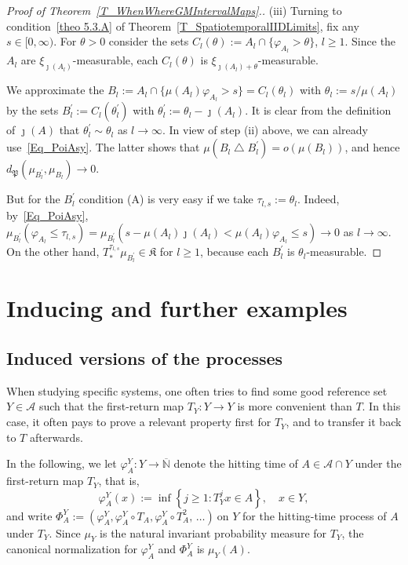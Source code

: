 \documentclass[AHL,Unicode,longabstracts]{cedram}
\newcommand{\clA}{\mathcal{A}}
\newcommand{\frkK}{\mathfrak{K}}
\newcommand{\frkP}{\mathfrak{P}}
\newcommand{\bbN}{\mathbb{N}}
\begin{document}
\begin{proof}[{Proof of Theorem~\ref{T_WhenWhereGMIntervalMaps}.}]
\vspace{6pt}
\noindent(iii) Turning to condition~\eqref{theo 5.3.A} of Theorem~\ref{T_SpatiotemporalIIDLimits}, fix any $s\in\lbrack0,\infty)$. For $\theta>0$ consider the sets $C_{l}(\theta):=A_{l}\cap\{\varphi_{A_{l}} >\theta\} $, $l\geq1$. Since the $A_{l}$ are $\xi_{\jmath(A_{l})}$-measurable, each $C_{l}(\theta)$ is $\xi_{\jmath(A_{l})+\theta}$-measurable.

We approximate the $B_{l}:=A_{l}\cap\{\mu(A_{l})\varphi_{A_{l}}>s\}=C_{l} (\theta_{l})$ with $\theta_{l}:=s/\mu(A_{l})$ by the sets $B_{l}^{\prime }:=C_{l}(\theta_{l}^{\prime})$ with $\theta_{l}^{\prime}:=\theta_{l} -\jmath(A_{l})$. It is clear from the definition of $\jmath(A)$ that $\theta_{l}^{\prime}\sim\theta_{l}$ as $l\rightarrow\infty$. In view of step (ii) above, we can already use~\eqref{Eq_PoiAsy}. The latter shows that $\mu(B_{l}\bigtriangleup B_{l}^{\prime})=o(\mu(B_{l}))$, and hence $d_{\frkP}(\mu_{B_{l}^{\prime}},\mu_{B_{l}})\rightarrow0$.

But for the $B_{l}^{\prime}$ condition (A) is very easy if we take $\tau _{l,s}:=\theta_{l}$. Indeed, by~\eqref{Eq_PoiAsy}, $\mu_{B_{l}^{\prime} }(\varphi_{A_{l}}\leq\tau_{l,s})=\mu_{B_{l}^{\prime}}(s-\mu(A_{l})\jmath (A_{l})<\mu(A_{l})\varphi_{A_{l}}\leq s)\rightarrow0$ as $l\rightarrow\infty$. On the other hand, $T_{\ast}^{\tau_{l,s}}\mu_{B_{l}^{\prime}}\in\frkK$ for $l\geq1$, because each $B_{l}^{\prime}$ is $\theta_{l}$-measurable.
\end{proof}




\section{Inducing and further examples}

\subsection{Induced versions of the processes}
When studying specific systems, one often tries to find some good reference set $Y\in\clA$ such that the first-return map $T_{Y}:Y\rightarrow Y$ is more convenient than $T$. In this case, it often pays to prove a relevant property first for $T_{Y}$, and to transfer it back to $T$ afterwards.

In the following, we let $\varphi_{A}^{Y}:Y\rightarrow\overline{\bbN} $ denote the hitting time of $A\in\clA\cap Y$ under the first-return map $T_{Y}$, that is,
\begin{equation}
\varphi_{A}^{Y}(x):=\inf\left\{j\geq1:T_{Y}^{j}x\in A\right\},\quad x\in Y,
\end{equation}
and write $\Phi_{A}^{Y}:=(\varphi_{A}^{Y},\varphi_{A}^{Y}\circ T_{A},\varphi_{A}^{Y}\circ T_{A}^{2},\,\ldots)\ $on $Y$ for the hitting-time process of $A$ under $T_{Y}$. Since $\mu_{Y}$ is the natural invariant probability measure for $T_{Y}$, the canonical normalization for $\varphi_{A}^{Y}$ and $\Phi_{A}^{Y}$ is $\mu_{Y}(A)$.
\end{document}
